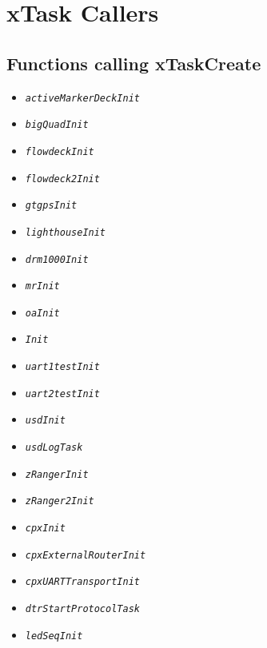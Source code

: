 \documentclass[10pt, a4paper]{article}
\newcommand{\textFunc}[1]{\texttt{\textit{#1}}}
\begin{document}
\appendix
\section{xTask Callers}
\subsection{Functions calling xTaskCreate}
\label{a:xTask}
\begin{multicols}{2}
    \begin{itemize}
        \item \textFunc{activeMarkerDeckInit}
        \item \textFunc{bigQuadInit}
        \item \textFunc{flowdeckInit}
        \item \textFunc{flowdeck2Init}
        \item \textFunc{gtgpsInit}
        \item \textFunc{lighthouseInit}
        \item \textFunc{drm1000Init}
        \item \textFunc{mrInit}
        \item \textFunc{oaInit}
        \item \textFunc{Init}
    \end{itemize}
\columnbreak
    \begin{itemize}
        \item \textFunc{uart1testInit}
        \item \textFunc{uart2testInit}
        \item \textFunc{usdInit}
        \item \textFunc{usdLogTask}
        \item \textFunc{zRangerInit}
        \item \textFunc{zRanger2Init}
        \item \textFunc{cpxInit}
        \item \textFunc{cpxExternalRouterInit}
        \item \textFunc{cpxUARTTransportInit}
        \item \textFunc{dtrStartProtocolTask}
        \item \textFunc{ledSeqInit}
    \end{itemize}
\end{multicols}
\end{document}
